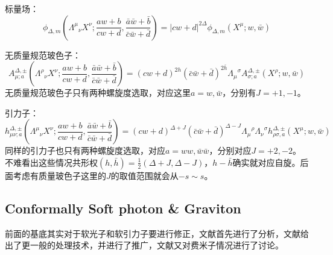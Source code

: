标量场：
\begin{equation}
	\phi_{\Delta,m}\left(\Lambda^{\mu}{}_{\nu}X^{\nu};\frac{aw+b}{cw+d},\frac{\bar{a}\bar{w}+\bar{b}}{\bar{c}\bar{w}+\bar{d}}\right)=|cw+d|^{2\Delta}\phi_{\Delta,m}(X^{\mu};w,\bar{w})
\end{equation}

无质量规范玻色子：
\begin{equation}
	A_{\mu;a}^{\Delta,\pm}\left({\Lambda^{\rho}}_{\nu}X^{\nu};\frac{aw+b}{cw+d},\frac{\bar{a}\bar{w}+\bar{b}}{\bar{c}\bar{w}+\bar{d}}\right)=(cw+d)^{2h}(\bar{c}\bar{w}+\bar{d})^{2\bar{h}}{\Lambda_{\mu}}^{\sigma}A_{\sigma;a}^{\Delta,\pm}(X^{\rho};w,\bar{w})
\end{equation}
无质量规范玻色子只有两种螺旋度选取，对应这里$a=w,\bar w$，分别有$J=+1,-1$。

引力子：
\begin{equation}
	h_{\mu\nu;a}^{\Delta,\pm}\left(\Lambda^{\mu}{}_{\nu}X^{\nu};\frac{aw+b}{cw+d},\frac{\bar{a}\bar{w}+\bar{b}}{\bar{c}\bar{w}+\bar{d}}\right)=(cw+d)^{\Delta+J}(\bar{c}\bar{w}+\bar{d})^{\Delta-J}{\Lambda_{\mu}}^{\rho}{\Lambda_{\nu}}^{\sigma}h_{\rho\sigma,a}^{\Delta,\pm}(X^{\mu};w,\bar{w})
\end{equation}
同样的引力子也只有两种螺旋度选取，对应$a=ww,\bar w\bar w$，分别对应$J=+2,-2$。
不难看出这些情况共形权$(h,\bar h)=\frac12(\Delta+J,\Delta-J)$，$h-\bar h$确实就对应自旋。后面考虑有质量玻色子这里的$J$的取值范围就会从$-s\sim s$。

\subsection{Conformally Soft photon \& Graviton}
前面的基底其实对于软光子和软引力子要进行修正，文献\cite{Donnay:2018neh}首先进行了分析，文献\cite{Donnay:2020guq}给出了更一般的处理技术，并进行了推广，文献\cite{Pano:2021ewd}又对费米子情况进行了讨论。
